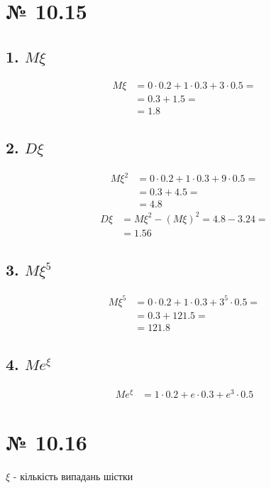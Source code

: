 \documentclass[11pt, a4paper]{article} %
\begin{document}

\section*{№ 10.15}
\subsection*{1. $M\xi$}
\begin{align*}
    M\xi &= 0\cdot 0.2 + 1\cdot 0.3 + 3\cdot 0.5 = \\
    &= 0.3 + 1.5 = \\
    &= 1.8
\end{align*}

\subsection*{2. $D\xi$}
\begin{align*}
    M\xi^2 &= 0\cdot 0.2 + 1\cdot 0.3 + 9\cdot 0.5 = \\
    &= 0.3 + 4.5 = \\
    &= 4.8
\end{align*}
\begin{align*}
    D\xi &= M\xi^2 - (M\xi)^2 = 4.8 - 3.24 = \\
    &= 1.56
\end{align*}

\subsection*{3. $M\xi^5$}
\begin{align*}
    M\xi^5 &= 0\cdot 0.2 + 1\cdot 0.3 + 3^5\cdot 0.5 = \\
    &= 0.3 + 121.5 = \\
    &= 121.8
\end{align*}

\subsection*{4. $Me^\xi$}
\begin{align*}
    Me^\xi &= 1 \cdot 0.2 + e \cdot 0.3 + e^3 \cdot 0.5 
\end{align*}

\section*{№ 10.16}
$\xi$ - кількість випадань шістки
\end{document}
